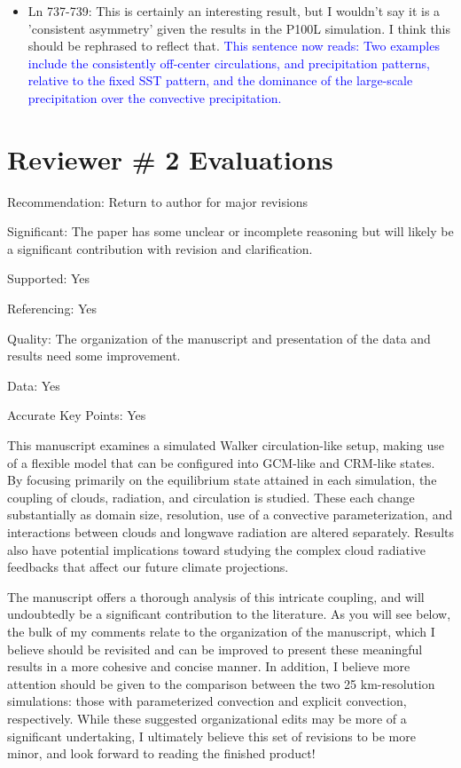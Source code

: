 \documentclass[draft]{agujournal2019}
\begin{document}
\begin{itemize}
  \item Ln 737-739: This is certainly an interesting result, but I wouldn't say it is a 'consistent asymmetry' given the results in the P100L simulation. I think this should be rephrased to reflect that.
  \textcolor{blue}{This sentence now reads: Two examples include the consistently off-center circulations, and precipitation patterns,
relative to the fixed SST pattern, and the dominance of the large-scale precipitation over the convective precipitation.}
%
\end{itemize}

\section{Reviewer \# 2 Evaluations}

Recommendation: Return to author for major revisions

Significant: The paper has some unclear or incomplete reasoning but will likely be a significant contribution with revision and clarification.

Supported: Yes

Referencing: Yes

Quality: The organization of the manuscript and presentation of the data and results need some improvement.

Data: Yes

Accurate Key Points: Yes

This manuscript examines a simulated Walker circulation-like setup, making use of a flexible model that can be configured into GCM-like and CRM-like states. By focusing primarily on the equilibrium state attained in each simulation, the coupling of clouds, radiation, and circulation is studied. These each change substantially as domain size, resolution, use of a convective parameterization, and interactions between clouds and longwave radiation are altered separately. Results also have potential implications toward studying the complex cloud radiative feedbacks that affect our future climate projections.

The manuscript offers a thorough analysis of this intricate coupling, and will undoubtedly be a significant contribution to the literature. As you will see below, the bulk of my comments relate to the organization of the manuscript, which I believe should be revisited and can be improved to present these meaningful results in a more cohesive and concise manner. In addition, I believe more attention should be given to the comparison between the two 25 km-resolution simulations: those with parameterized convection and explicit convection, respectively. While these suggested organizational edits may be more of a significant undertaking, I ultimately believe this set of revisions to be more minor, and look forward to reading the finished product!
\end{document}
